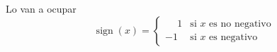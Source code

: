 \documentclass{article}
\DeclareMathOperator{\signo}{sign}
\begin{document}
Lo van a ocupar
$$
    \signo(x) = \begin{cases}
                    \phantom{-}1 & \textrm{si } x \textrm{ es no negativo} \\
                    -1 & \textrm{si } x \textrm{ es negativo}
               \end{cases}
$$
\end{document}
